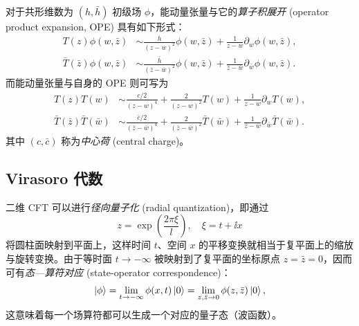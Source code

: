 对于共形维数为 $(h,\bar{h})$ 初级场 $\phi$，能动量张量与它的\emph{算子积展开} (operator product expansion, OPE) 具有如下形式：
\begin{equation}
  \begin{aligned}
    T(z) \phi(w,\bar{z}) &\sim
      \frac{h}{(z-w)^2} \phi(w,\bar{z}) + \frac{1}{z-w} \partial_w\phi(w,\bar{z}), \\
    \bar{T}(\bar{z}) \phi(w,\bar{z}) &\sim
      \frac{\bar{h}}{(\bar{z}-\bar{w})^2} \phi(w,\bar{z}) + \frac{1}{\bar{z}-\bar{w}} \partial_{\bar{w}}\phi(w,\bar{z}).
  \end{aligned}
  \label{eq:t-phi-ope}
\end{equation}
而能动量张量与自身的 OPE 则可写为
\begin{equation}
  \begin{aligned}
    T(z) T(w) &\sim
      \frac{c/2}{(z-w)^4} + \frac{2}{(z-w)^2} T(w) + \frac{1}{z-w} \partial_w T(w), \\
    \bar{T}(\bar{z}) \bar{T}(\bar{w}) &\sim
        \frac{\bar{c}/2}{(\bar{z}-\bar{w})^4}
      + \frac{2}{(\bar{z}-\bar{w})^2} \bar{T}(\bar{w})
      + \frac{1}{\bar{z}-\bar{w}} \partial_{\bar{w}}\bar{T}(\bar{w}).
  \end{aligned}
\end{equation}
其中 $(c,\bar{c})$ 称为\emph{中心荷} (central charge)。

\subsection{Virasoro 代数}

二维 CFT 可以进行\emph{径向量子化} (radial quantization)，即通过
\begin{equation}
  z = \exp\left( \frac{2\pi\xi}{l} \right), \quad \xi = t+\ii x
  \label{eq:radial-quantization}
\end{equation}
将圆柱面映射到平面上，这样时间 $t$、空间 $x$ 的平移变换就相当于复平面上的缩放与旋转变换。由于等时面 $t\to-\infty$ 被映射到了复平面的坐标原点 $z=\bar{z}=0$，因而可有\emph{态—算符对应} (state-operator correspondence)：
\begin{equation}
  \ket{\phi} = \lim_{t\to-\infty}\phi(x,t) \ket{0} = \lim_{z,\bar{z}\to 0} \phi(z,\bar{z}) \ket{0},
\end{equation}
这意味着每一个场算符都可以生成一个对应的量子态（波函数）。

